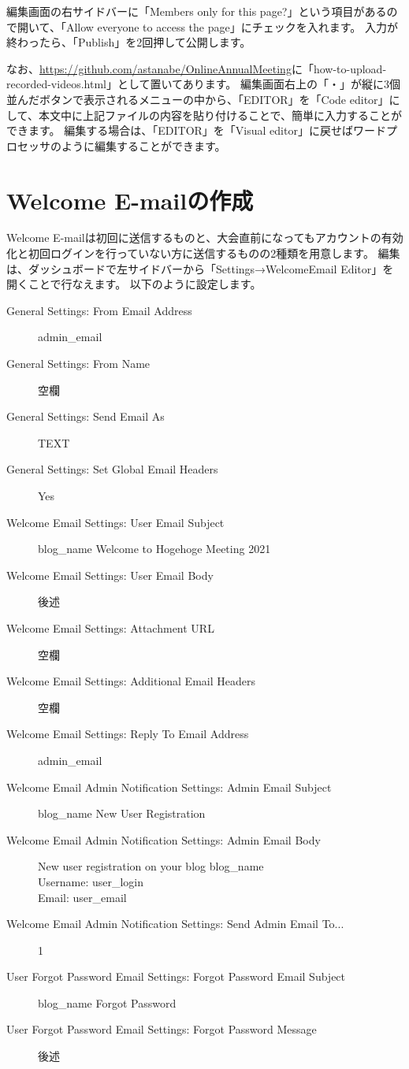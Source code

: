 \documentclass[titlepage,10pt,a4paper,uplatex]{jsbook}
\begin{document}
編集画面の右サイドバーに「Members only for this page?」という項目があるので開いて、「Allow everyone to access the page」にチェックを入れます。
入力が終わったら、「Publish」を2回押して公開します。

なお、\url{https://github.com/astanabe/OnlineAnnualMeeting}に「how-to-upload-recorded-videos.html」として置いてあります。
編集画面右上の「・」が縦に3個並んだボタンで表示されるメニューの中から、「EDITOR」を「Code editor」にして、本文中に上記ファイルの内容を貼り付けることで、簡単に入力することができます。
編集する場合は、「EDITOR」を「Visual editor」に戻せばワードプロセッサのように編集することができます。

\section{Welcome E-mailの作成}

Welcome E-mailは初回に送信するものと、大会直前になってもアカウントの有効化と初回ログインを行っていない方に送信するものの2種類を用意します。
編集は、ダッシュボードで左サイドバーから「Settings→WelcomeEmail Editor」を開くことで行なえます。
以下のように設定します。

\begin{description}
\item[General Settings: From Email Address] {\lbrack}admin\_email{\rbrack}
\item[General Settings: From Name] 空欄
\item[General Settings: Send Email As] TEXT
\item[General Settings: Set Global Email Headers] Yes
\item[Welcome Email Settings: User Email Subject] {\lbrack}{\lbrack}blog\_name{\rbrack}{\rbrack} Welcome to Hogehoge Meeting 2021
\item[Welcome Email Settings: User Email Body] 後述
\item[Welcome Email Settings: Attachment URL] 空欄
\item[Welcome Email Settings: Additional Email Headers] 空欄
\item[Welcome Email Settings: Reply To Email Address] {\lbrack}admin\_email{\rbrack}
\item[Welcome Email Admin Notification Settings: Admin Email Subject] {\lbrack}{\lbrack}blog\_name{\rbrack}{\rbrack} New User Registration
\item[Welcome Email Admin Notification Settings: Admin Email Body] New user registration on your blog {\lbrack}blog\_name{\rbrack}\\
Username: {\lbrack}user\_login{\rbrack}\\
Email: {\lbrack}user\_email{\rbrack}
\item[Welcome Email Admin Notification Settings: Send Admin Email To...] 1
\item[User Forgot Password Email Settings: Forgot Password Email Subject] {\lbrack}{\lbrack}blog\_name{\rbrack}{\rbrack} Forgot Password
\item[User Forgot Password Email Settings: Forgot Password Message] 後述
\end{description}
\end{document}
